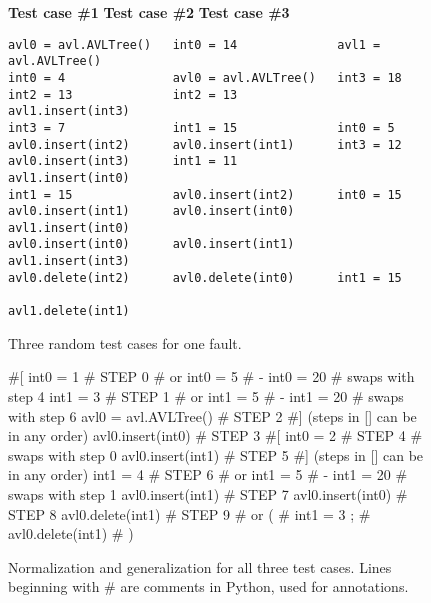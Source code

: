 \begin{figure}[t]
{\scriptsize
{\bf Test case \#1}\hspace{0.415in} {\bf Test case \#2} \hspace{0.41in}
{\bf Test case \#3}
\begin{verbatim}
avl0 = avl.AVLTree()   int0 = 14              avl1 = avl.AVLTree()
int0 = 4               avl0 = avl.AVLTree()   int3 = 18 
int2 = 13              int2 = 13              avl1.insert(int3) 
int3 = 7               int1 = 15              int0 = 5 
avl0.insert(int2)      avl0.insert(int1)      int3 = 12 
avl0.insert(int3)      int1 = 11              avl1.insert(int0) 
int1 = 15              avl0.insert(int2)      int0 = 15 
avl0.insert(int1)      avl0.insert(int0)      avl1.insert(int0) 
avl0.insert(int0)      avl0.insert(int1)      avl1.insert(int3) 
avl0.delete(int2)      avl0.delete(int0)      int1 = 15 
                                              avl1.delete(int1) 
\end{verbatim}
}
\caption {\scriptsize{Three random test cases for one fault.}}
\label{threetests}
\end{figure}

\begin{figure}[t]
{\scriptsize
\begin{code}
\textcolor{black!60}{\#[}
int0 = 1                              \textcolor{black!60}{\# STEP 0}
\textcolor{black!60}{\#  or int0 = 5 }
\textcolor{black!60}{\#   - int0 = 20} 
\textcolor{black!60}{\#  swaps with step 4}
int1 = 3                              \textcolor{black!60}{\# STEP 1}
\textcolor{black!60}{\#  or int1 = 5 }
\textcolor{black!60}{\#   - int1 = 20} 
\textcolor{black!60}{\#  swaps with step 6}
avl0 = avl.AVLTree()                  \textcolor{black!60}{\# STEP 2}
\textcolor{black!60}{\#] (steps in [] can be in any order)}
avl0.insert(int0)                     \textcolor{black!60}{\# STEP 3}
\textcolor{black!60}{\#[}
int0 = 2                              \textcolor{black!60}{\# STEP 4}
\textcolor{black!60}{\#  swaps with step 0}
avl0.insert(int1)                     \textcolor{black!60}{\# STEP 5}
\textcolor{black!60}{\#] (steps in [] can be in any order)}
int1 = 4                              \textcolor{black!60}{\# STEP 6}
\textcolor{black!60}{\#  or int1 = 5 }
\textcolor{black!60}{\#   - int1 = 20} 
\textcolor{black!60}{\#  swaps with step 1}
avl0.insert(int1)                     \textcolor{black!60}{\# STEP 7}
avl0.insert(int0)                     \textcolor{black!60}{\# STEP 8}
avl0.delete(int1)                     \textcolor{black!60}{\# STEP 9}
\textcolor{black!60}{\#  or (}
\textcolor{black!60}{\#      int1 = 3  ;}
\textcolor{black!60}{\#      avl0.delete(int1) }
\textcolor{black!60}{\#     )}
\end{code}
}
\caption{\scriptsize{Normalization and generalization for all three test cases.
  Lines beginning with \# are comments in Python, used for annotations.}}
\label{normalgen}
\end{figure}

